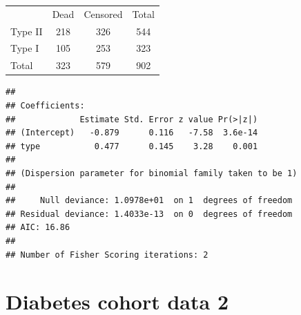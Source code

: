 \documentclass[10pt]{beamer}\usepackage[]{graphicx}\usepackage[]{color}
\makeatletter
\newenvironment{kframe}{%
 \def\at@end@of@kframe{}%
 \ifinner\ifhmode%
  \def\at@end@of@kframe{\end{minipage}}%
  \begin{minipage}{\columnwidth}%
 \fi\fi%
 \def\FrameCommand##1{\hskip\@totalleftmargin \hskip-\fboxsep
 \colorbox{shadecolor}{##1}\hskip-\fboxsep
     \hskip-\linewidth \hskip-\@totalleftmargin \hskip\columnwidth}%
 \MakeFramed {\advance\hsize-\width
   \@totalleftmargin\z@ \linewidth\hsize
   \@setminipage}}%
 {\par\unskip\endMakeFramed%
 \at@end@of@kframe}
\newenvironment{knitrout}{}{} %
\makeatother
\begin{document}
\begin{frame}
	\vspace{-1.31in}
	\tiny
\begin{table}[h]
	\centering
	\begin{tabular}{lcc|c}
		& Dead &  Censored & Total\\
		Type II & 218 & 326 & 544 \\
		Type I & 105 & 253 & 323 \\
		\hline
		Total & 323 & 579 & 902
	\end{tabular}
\end{table}

	\vspace{-.21in}
\begin{knitrout}\tiny
{}\color{fgcolor}\begin{kframe}
\begin{verbatim}
## 
## Coefficients:
##             Estimate Std. Error z value Pr(>|z|)
## (Intercept)   -0.879      0.116   -7.58  3.6e-14
## type           0.477      0.145    3.28    0.001
## 
## (Dispersion parameter for binomial family taken to be 1)
## 
##     Null deviance: 1.0978e+01  on 1  degrees of freedom
## Residual deviance: 1.4033e-13  on 0  degrees of freedom
## AIC: 16.86
## 
## Number of Fisher Scoring iterations: 2
\end{verbatim}
\end{kframe}
\end{knitrout}
\end{frame}


\section{Diabetes cohort data 2}
\end{document}
